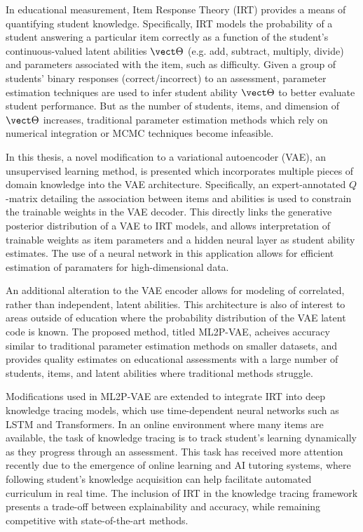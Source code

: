 
In educational measurement, Item Response Theory (IRT) provides a means of quantifying student knowledge. Specifically, IRT models the probability of a student answering a particular item correctly as a function of the student's continuous-valued latent abilities $\vect \Theta$ (e.g. add, subtract, multiply, divide) and parameters associated with the item, such as difficulty. Given a group of students' binary responses (correct/incorrect) to an assessment, parameter estimation techniques are used to infer student ability $\vect \Theta$ to better evaluate student performance. But as the number of students, items, and dimension of $\vect \Theta$ increases, traditional parameter estimation methods which rely on numerical integration or MCMC techniques become infeasible. 

In this thesis, a novel modification to a variational autoencoder (VAE), an unsupervised learning method, is presented which incorporates multiple pieces of domain knowledge into the VAE architecture. Specifically, an expert-annotated $Q$-matrix detailing the association between items and abilities is used to constrain the trainable weights in the VAE decoder. This directly links the generative posterior distribution of a VAE to IRT models, and allows interpretation of trainable weights as item parameters and a hidden neural layer as student ability estimates. The use of a neural network in this application allows for efficient estimation of paramaters for high-dimensional data.

An additional alteration to the VAE encoder allows for modeling of correlated, rather than independent, latent abilities. This architecture is also of interest to areas outside of education where the probability distribution of the VAE latent code is known. The proposed method, titled ML2P-VAE, acheives accuracy similar to traditional parameter estimation methods on smaller datasets, and provides quality estimates on educational assessments with a large number of students, items, and latent abilities where traditional methods struggle.

Modifications used in ML2P-VAE are extended to integrate IRT into deep knowledge tracing models, which use time-dependent neural networks such as LSTM and Transformers. In an online environment where many items are available, the task of knowledge tracing is to track student's learning dynamically as they progress through an assessment. This task has received more attention recently due to the emergence of online learning and AI tutoring systems, where following student's knowledge acquisition can help facilitate automated curriculum in real time. The inclusion of IRT in the knowledge tracing framework presents a trade-off between explainability and accuracy, while remaining competitive with state-of-the-art methods.


